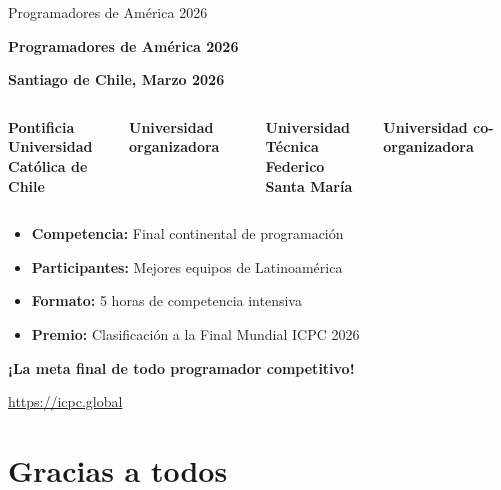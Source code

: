\documentclass{beamer}
\begin{document}
\begin{frame}{Programadores de América 2026}
\begin{center}
\Large
\textbf{Programadores de América 2026}

\vspace{0.3cm}

\normalsize
\textbf{Santiago de Chile, Marzo 2026}

\vspace{0.3cm}

\begin{columns}[t]
\centering
\textbf{Pontificia Universidad}\\
\textbf{Católica de Chile}

\vspace{0.5cm}

\textbf{Universidad organizadora}

\centering
\textbf{Universidad Técnica}\\
\textbf{Federico Santa María}

\vspace{0.5cm}

\textbf{Universidad co-organizadora}

\end{columns}

\vspace{0.5cm}

\begin{itemize}
\item \textbf{Competencia:} Final continental de programación
\item \textbf{Participantes:} Mejores equipos de Latinoamérica
\item \textbf{Formato:} 5 horas de competencia intensiva
\item \textbf{Premio:} Clasificación a la Final Mundial ICPC 2026
\end{itemize}

\vspace{0.3cm}

\textbf{¡La meta final de todo programador competitivo!}

\vspace{0.1cm}

\small
\url{https://icpc.global}
\end{center}
\end{frame}


\section{Gracias a todos}
\end{document}
